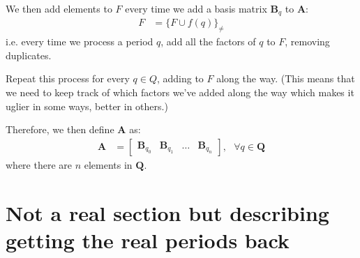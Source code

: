 We then add elements to $F$ every time we add a basis matrix $\bm{B}_q$ to $\bm{A}$:
\begin{align*}
    F &= \{ F \cup f(q) \}_{\neq}
\end{align*}
i.e. every time we process a period $q$, add all the factors of $q$ to $F$, removing duplicates.

Repeat this process for every $q \in Q$, adding to $F$ along the way. (This means that we need to keep track of which factors we've added along the way which makes it uglier in some ways, better in others.)

Therefore, we then define $\bm{A}$ as:
\begin{align*}
    \bm{A} &= \begin{bmatrix}
            \bm{B}_{q_0} &
            \bm{B}_{q_1} &
            \hdots &
            \bm{B}_{q_n}
        \end{bmatrix}
        , \text{ } \forall q \in \bm{Q}
\end{align*}
where there are $n$ elements in $\bm{Q}$.

\section{Not a real section but describing getting the real periods back}
